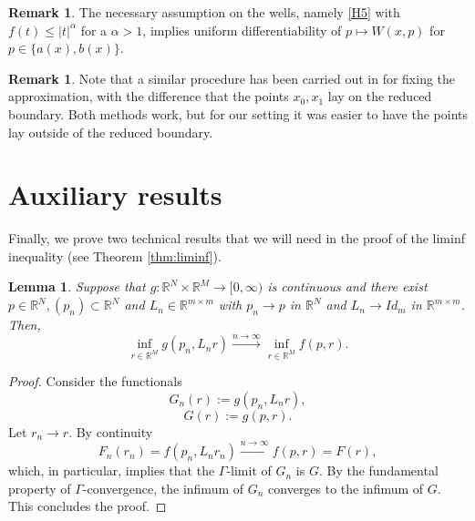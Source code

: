 \documentclass[a4paper, 11pt, reqno]{amsart}
\theoremstyle{plain}
\newtheorem{lemma}[theorem]{Lemma}
\theoremstyle{definition}
\newtheorem{remark}[theorem]{Remark}
\theoremstyle{remark}
\newcommand{\R}{\mathbb R}
\begin{document}
\begin{remark}
    The necessary assumption on the wells, namely \ref{H5} with $f(t) \leq |t|^\alpha$ for a $\alpha > 1$, implies uniform differentiability of $p \mapsto W(x,p)$ for $p \in \{a(x), b(x)\}$.
\end{remark}

\begin{remark}
    Note that a similar procedure has been carried out in \cite{cristoferi2025phaseseparationmultiplyperiodic} for fixing the approximation, with the difference that the points $x_0, x_1$ lay on the reduced boundary. Both methods work, but for our setting it was easier to have the points lay outside of the reduced boundary.
\end{remark}






\appendix
\section{Auxiliary results}


Finally, we prove two technical results that we will need in the proof of the liminf inequality (see Theorem \ref{thm:liminf}).

\begin{lemma}\label{lemma:technical}
        Suppose that $g: \R^N \times \R^M \to [0, \infty)$ is continuous and there exist $p \in \R^N, (p_n) \subset \R^N$ and $L_n \in \R^{m \times m}$ with $p_n \to p$ in $\R^N$ and $L_n \to Id_m$ in $\R^{m \times m}$. Then,
        \[
            \inf_{r \in \R^M} g(p_n, L_n r) \xrightarrow{n \to \infty} \inf_{r \in \R^M} f(p, r).
        \]
    \end{lemma}
    
    \begin{proof}
        Consider the functionals
        \[
            G_n(r) := g(p_n, L_n r),
        \]
        \[
            G(r) := g(p, r).
        \]
        Let $r_n \to r$. By continuity 
        \[
            F_n(r_n) = f(p_n, L_n r_n) \xrightarrow{n \to \infty} f(p, r) = F(r),
        \]
        which, in particular, implies that the $\Gamma$-limit of $G_n$ is $G$. By the fundamental property of $\Gamma$-convergence, the infimum of $G_n$ converges to the infimum of $G$. This concludes the proof.
    \end{proof}
    
\end{document}
